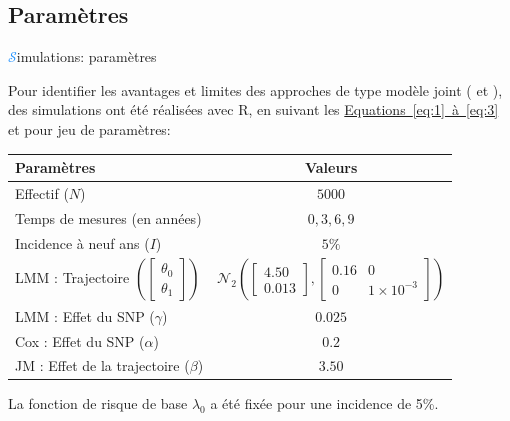 \subsection{Paramètres}
\begin{frame}{{\huge\textcolor{dodgerblue}{$\mathcal{S}$}}imulations: paramètres}
\par{Pour identifier les avantages et limites des approches de type modèle joint ( et ),
des simulations ont été réalisées avec R, en suivant les \hyperref[eq:1]{Equations~\ref*{eq:1}~à~\ref{eq:3}} et pour
jeu de paramètres:
{\footnotesize \begin{center}
    \begin{tabular}{lc}
        \hline
        Paramètres & Valeurs\\
        \hline
        Effectif ($N$) & $5000$\\
        Temps de mesures (en années) & $0, 3, 6, 9$\\
        Incidence à neuf ans ($I$) & $5\%$\\
        LMM : Trajectoire $\left (\begin{bmatrix}\theta_{0}\\\theta_{1}\end{bmatrix}\right )$ & $\mathcal{N}_2\left (\begin{bmatrix}4.50\\0.013\end{bmatrix} , \begin{bmatrix} 0.16 & 0 \\ 0 & 1\times 10^{-3} \end{bmatrix} \right )$\\
        LMM : Effet du SNP ($\gamma$) & $0.025$\\
        Cox : Effet du SNP ($\alpha$) & $0.2$\\
        JM : Effet de la trajectoire ($\beta$) & $3.50$\\
        \hline
    \end{tabular}
\end{center}}
La fonction de risque de base \textcolor{springgreen3}{$\lambda_0$} a été fixée pour une incidence de \textcolor{springgreen3}{5\%}.
}
\end{frame}



